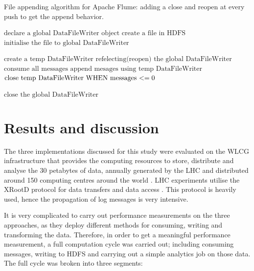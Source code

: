\begin{algorithm}[H]
\caption{File appending algorithm for Apache Flume: adding a close and reopen at every push to get the append behavior.}\label{alg:append_alg}
\begin{algorithmic}[1]
\State $ \text{declare a global DataFileWriter object}$
\State $ \text{create a file in HDFS}$
\State $ \text{initialise the file to global DataFileWriter}$
\item[]
\EndProcedure
\end{algorithmic}
\begin{algorithmic}[1]
\State $ \text{create a temp  DataFileWriter refelecting(reopen) the global DataFileWriter}$
\State $ \text{consume all messages}$
\State $ \text{append mesages using temp DataFileWriter}$
\State $ \text{close temp DataFileWriter WHEN messages \( <=0 \)}$
\item[]
\EndProcedure
\end{algorithmic}
\begin{algorithmic}[1]
\State $ \text{close the global DataFileWriter} $
\item[]
\EndProcedure
\end{algorithmic}
\end{algorithm}


\section{Results and discussion} \label{lbl-results}
The three implementations discussed for this study were evaluated on the WLCG infrastructure that provides the computing resources to store, distribute and analyse the 30 petabytes of data, annually generated by the LHC and distributed around 150 computing centres around the world \cite{Gardner19}. LHC experiments utilise the XRootD protocol for data transfers and data access \cite{Gardner19}. This protocol is heavily used, hence the propagation of log messages is very intensive.

It is very complicated to carry out performance measurements on the three approaches, as they deploy different methods for consuming, writing and transforming the data. Therefore, in order to get a meaningful performance measurement, a full computation cycle was carried out; including consuming messages, writing to HDFS and carrying out a simple analytics job on those data. The full cycle was broken into three segments:

